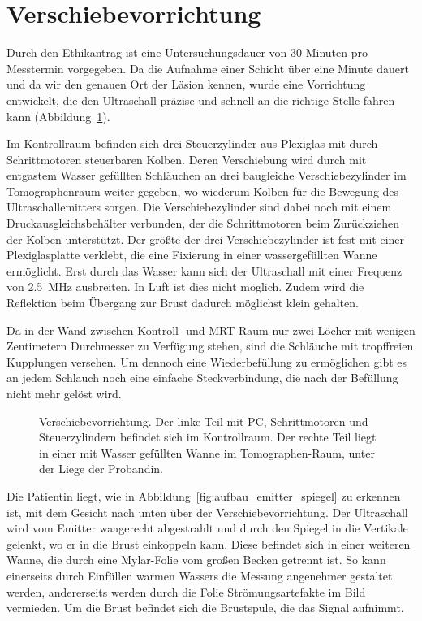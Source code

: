 \documentclass[
    11pt,
    ngerman
]{scrreprt}
\begin{document}
\section{Verschiebevorrichtung}

Durch den Ethikantrag ist eine Untersuchungsdauer von 30 Minuten pro Messtermin
vorgegeben. Da die Aufnahme einer Schicht über eine Minute dauert und da wir
den genauen Ort der Läsion kennen, wurde eine Vorrichtung entwickelt, die den
Ultraschall präzise und schnell an die richtige Stelle fahren kann
(Abbildung~\ref{fig:aufbau_total}).

Im Kontrollraum befinden sich drei Steuerzylinder aus Plexiglas mit durch
Schrittmotoren steuerbaren Kolben. Deren Verschiebung wird durch mit
entgastem Wasser gefüllten Schläuchen an drei baugleiche Verschiebezylinder im
Tomographenraum weiter gegeben, wo wiederum Kolben für die Bewegung des
Ultraschallemitters sorgen. Die Verschiebezylinder sind dabei noch mit einem
Druckausgleichsbehälter verbunden, der die Schrittmotoren beim Zurückziehen der
Kolben unterstützt. Der größte der drei Verschiebezylinder ist fest mit einer
Plexiglasplatte verklebt, die eine Fixierung in einer wassergefüllten Wanne
ermöglicht. Erst durch das Wasser kann sich der Ultraschall mit einer Frequenz
von \SI{2.5}{\mega\hertz} ausbreiten. In Luft ist dies nicht möglich. Zudem wird
die Reflektion beim Übergang zur Brust dadurch möglichst klein gehalten.

Da in der Wand zwischen Kontroll- und MRT-Raum nur zwei Löcher mit wenigen
Zentimetern Durchmesser zu Verfügung stehen, sind die Schläuche mit
tropffreien Kupplungen versehen. Um dennoch eine Wiederbefüllung zu ermöglichen
gibt es an jedem Schlauch noch eine einfache Steckverbindung, die nach der
Befüllung nicht mehr gelöst wird.

\begin{figure}[htbp]
    \centering
    \resizebox{\textwidth}{!}{}
    \caption{%
        Verschiebevorrichtung. Der linke Teil mit PC, Schrittmotoren und Steuerzylindern befindet sich im Kontrollraum. Der rechte Teil liegt in einer mit Wasser gefüllten Wanne im Tomographen-Raum, unter der Liege der Probandin.
    }
    \label{fig:aufbau_total}
\end{figure}

Die Patientin liegt, wie in Abbildung~\ref{fig:aufbau_emitter_spiegel} zu
erkennen ist, mit dem Gesicht nach unten über der Verschiebevorrichtung. Der
Ultraschall wird vom Emitter waagerecht abgestrahlt und durch den Spiegel in
die Vertikale gelenkt, wo er in die Brust einkoppeln kann. Diese befindet sich
in einer weiteren Wanne, die durch eine Mylar-Folie vom großen Becken getrennt
ist. So kann einerseits durch Einfüllen warmen Wassers die Messung angenehmer
gestaltet werden, andererseits werden durch die Folie Strömungsartefakte im
Bild vermieden. Um die Brust befindet sich die Brustspule, die das Signal
aufnimmt.
\end{document}
